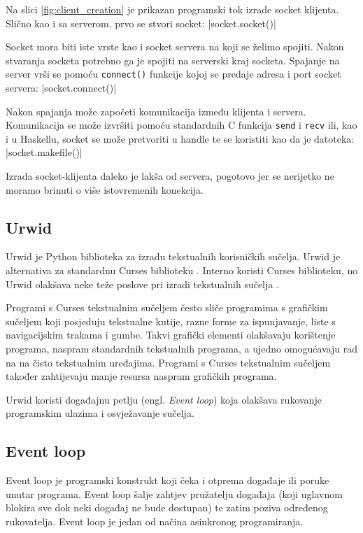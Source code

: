 Na slici \ref{fig:client_creation} je prikazan programski tok izrade socket
klijenta. Slično kao i sa serverom, prvo se stvori socket:
|socket.socket()|

Socket mora biti iste vrste kao i socket servera na koji se želimo spojiti.
Nakon stvaranja socketa potrebno ga je spojiti na serverski kraj socketa.
Spajanje na server vrši se pomoću \texttt{connect()} funkcije kojoj se
predaje adresa i port socket servera:
|socket.connect()|

Nakon spajanja može započeti komunikacija između klijenta i servera.
Komunikacija se može izvršiti pomoću standardnih C funkcija \texttt{send}
i \texttt{recv} ili, kao i u Haskellu, socket se može pretvoriti u handle
te se koristiti kao da je datoteka:
|socket.makefile()|

Izrada socket-klijenta daleko je lakša od servera, pogotovo jer se nerijetko ne
moramo brinuti o više istovremenih konekcija.

\newpage
\subsection{Urwid}

Urwid je Python biblioteka za izradu tekstualnih korisničkih sučelja. Urwid je
alternativa za standardnu Curses biblioteku \cite{curses}. Interno
koristi Curses biblioteku, no Urwid olakšava neke teže poslove pri izradi
tekstualnih sučelja \cite{urwid}.

Programi s Curses tekstualnim sučeljem često sliče programima s grafičkim
sučeljem koji posjeduju tekstualne kutije, razne forme za ispunjavanje, liste
s navigacijskim trakama i gumbe. Takvi grafički elementi olakšavaju korištenje 
programa, naspram standardnih tekstualnih programa, a ujedno omogućavaju rad na
na čisto tekstualnim uređajima. Programi s Curses tekstualnim sučeljem
također zahtijevaju manje resursa naspram grafičkih programa.

Urwid koristi događajnu petlju (engl. \emph{Event loop}) koja olakšava
rukovanje programskim ulazima i osvježavanje sučelja.

\subsection{Event loop}

Event loop je programski konstrukt koji čeka i otprema događaje ili poruke
unutar programa. Event loop šalje zahtjev pružatelju događaja (koji uglavnom
blokira sve dok neki događaj ne bude dostupan) te zatim poziva određenog
rukovatelja. Event loop je jedan od načina asinkronog programiranja.

